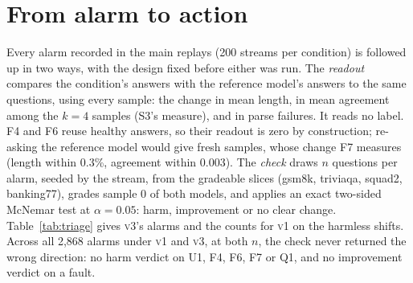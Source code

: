 \documentclass[11pt]{article}
\newcommand{\vone}{\textsc{v1}}
\newcommand{\vthree}{\textsc{v3}}
\begin{document}
\section{From alarm to action}
\label{app:triage}
Every alarm recorded in the main replays (200 streams per condition) is followed
up in two ways, with the design fixed before either was run. The \emph{readout}
compares the condition's answers with the reference model's answers to the same
questions, using every sample: the change in mean length, in mean agreement among
the $k=4$ samples (S3's measure), and in parse failures. It reads no label. F4 and
F6 reuse healthy answers, so their readout is zero by construction; re-asking the
reference model would give fresh samples, whose change F7 measures (length within
0.3\%, agreement within 0.003). The \emph{check} draws $n$ questions per alarm,
seeded by the stream, from the gradeable slices (\textsf{gsm8k}, \textsf{triviaqa},
\textsf{squad2}, \textsf{banking77}), grades sample 0 of both models, and applies
an exact two-sided McNemar test at $\alpha=0.05$: harm, improvement or no clear
change. Table~\ref{tab:triage} gives \vthree{}'s alarms and the counts for
\vone{} on the harmless shifts. Across all 2{,}868 alarms under \vone{} and \vthree{}, at
both $n$, the check never returned the wrong direction: no harm verdict on U1, F4, F6, F7 or Q1, and no
improvement verdict on a fault.
\end{document}
